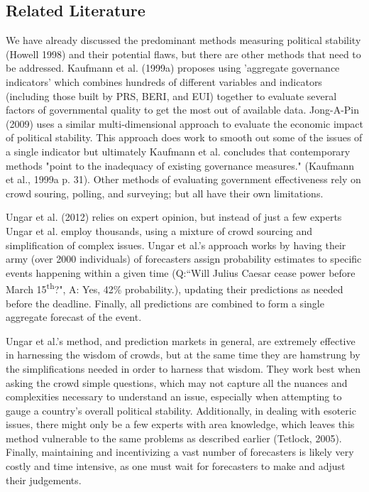 \documentclass[12pt]{article}
\begin{document}
\begin{spacing}{1.5}
\section*{Related Literature}   

We have already discussed the predominant methods measuring political stability (Howell 1998) and their potential flaws, but there are other methods that need to be addressed. Kaufmann et al. (1999a) proposes using 'aggregate governance indicators' which combines hundreds of different variables and indicators (including those built by PRS, BERI, and EUI) together to evaluate several factors of governmental quality to get the most out of available data. Jong-A-Pin (2009) uses a similar multi-dimensional approach to evaluate the economic impact of political stability. This approach does work to smooth out some of the issues of a single indicator but ultimately Kaufmann et al. concludes that contemporary methods "point to the inadequacy of existing governance measures." (Kaufmann et al., 1999a p. 31). Other methods of evaluating government effectiveness rely on crowd souring, polling, and surveying; but all have their own limitations. 

Ungar et al. (2012) relies on expert opinion, but instead of just a few experts Ungar et al. employ thousands, using a mixture of crowd sourcing and simplification of complex issues. Ungar et al.'s approach works by having their army (over 2000 individuals) of forecasters assign probability estimates to specific events happening within a given time (Q:``Will Julius Caesar cease power before March 15\textsuperscript{th}?", A: Yes, 42\% probability.), updating their predictions as needed before the deadline. Finally, all predictions are combined to form a single aggregate forecast of the event. 

Ungar et al.'s method, and prediction markets in general, are extremely effective in harnessing the wisdom of crowds, but at the same time they are hamstrung by the simplifications needed in order to harness that wisdom. They work best when asking the crowd simple questions, which may not capture all the nuances and complexities necessary to understand an issue, especially when attempting to gauge a country's overall political stability. Additionally, in dealing with esoteric issues, there might only be a few experts with area knowledge, which leaves this method vulnerable to the same problems as described earlier (Tetlock, 2005). Finally, maintaining and incentivizing a vast number of forecasters is likely very costly and time intensive, as one must wait for forecasters to make and adjust their judgements. 


\end{spacing}
\end{document}
